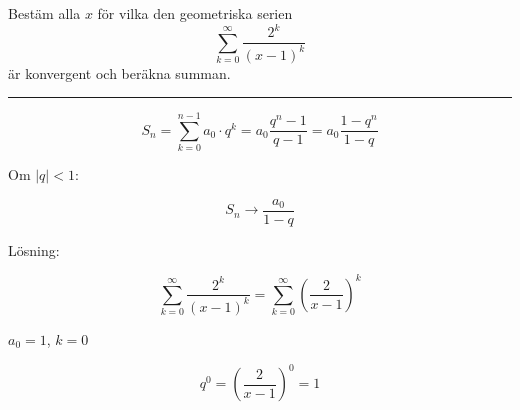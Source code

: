 \documentclass[11pt]{article}
\begin{document}
Bestäm alla $x$ för vilka den geometriska serien
\[
  \sum_{k = 0}^{\infty} \frac{2^k}{(x - 1)^k}
\]
är konvergent och beräkna summan.

\noindent\rule{\textwidth}{0.5pt}

\[
    S_n = \sum_{k = 0}^{n - 1} a_0 \cdot q^k = a_0 \frac{q^n - 1}{q - 1} = a_0 \frac{1 - q^n}{1 - q}
\]

Om $|q| < 1$:

\[
    S_n \rightarrow \frac{a_0}{1 - q}
\]

Lösning:

\[
    \sum_{k = 0}^{\infty} \frac{2^k}{(x - 1)^k} = \sum_{k = 0}^{\infty} \left(\frac{2}{x - 1}\right)^k
\]

$a_0 = 1$, $k = 0$

\[
    q^0 = \left(\frac{2}{x - 1}\right)^0 = 1
\]

%
%
%
%

\end{document}
